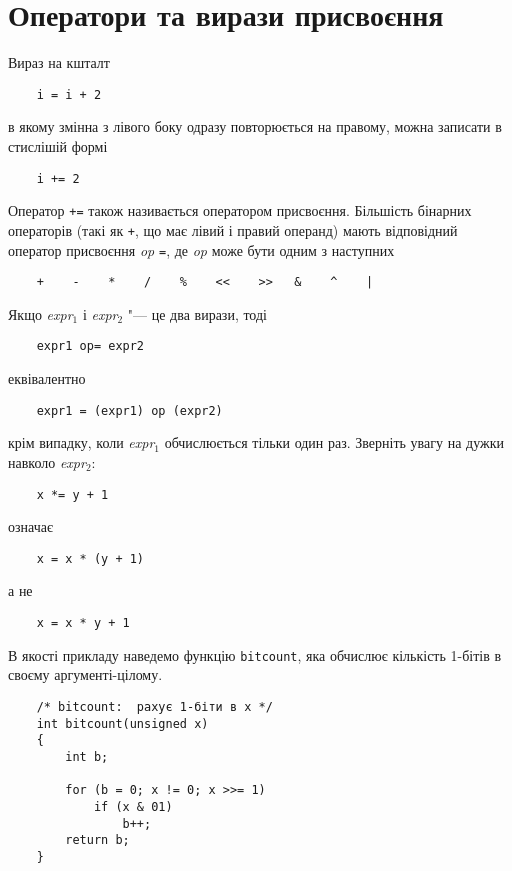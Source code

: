 \documentclass[a4paper,12pt]{book}
\begin{document}
\section{Оператори та вирази присвоєння}


  Вираз на кшталт
  \begin{verbatim}
    i = i + 2
  \end{verbatim}
  в якому змінна з лівого боку одразу повторюється на правому, можна записати в стислішій
  формі
  \begin{verbatim}
    i += 2
  \end{verbatim}

  Оператор \texttt{+=} також називається оператором присвоєння. Більшість бінарних
  операторів (такі як \texttt{+}, що має лівий і правий операнд) мають відповідний
  оператор присвоєння \textit{op} \texttt{=}, де \textit{op} може бути одним з наступних
  \begin{verbatim}
    +    -    *    /    %    <<    >>   &    ^    |
  \end{verbatim}

  Якщо \textit{expr\(_{1}\)} і \textit{expr\(_{2}\)} "--- це два вирази, тоді
  \begin{verbatim}
    expr1 op= expr2
  \end{verbatim}
  еквівалентно
  \begin{verbatim}
    expr1 = (expr1) op (expr2)
  \end{verbatim}
  крім випадку, коли \textit{expr\(_{1}\)} обчислюється тільки один раз. Зверніть увагу
  на дужки навколо \textit{expr\(_{2}\)}:
  \begin{verbatim}
    x *= y + 1
  \end{verbatim}
  означає
  \begin{verbatim}
    x = x * (y + 1)
  \end{verbatim}
  а не
  \begin{verbatim}
    x = x * y + 1
  \end{verbatim}

  В якості прикладу наведемо функцію \texttt{bitcount}, яка обчислює кількість 1-бітів в
  своєму аргументі-цілому.

  \begin{verbatim}
    /* bitcount:  рахує 1-біти в x */
    int bitcount(unsigned x)
    {
        int b;

        for (b = 0; x != 0; x >>= 1)
            if (x & 01)
                b++;
        return b;
    }
  \end{verbatim}
\end{document}
